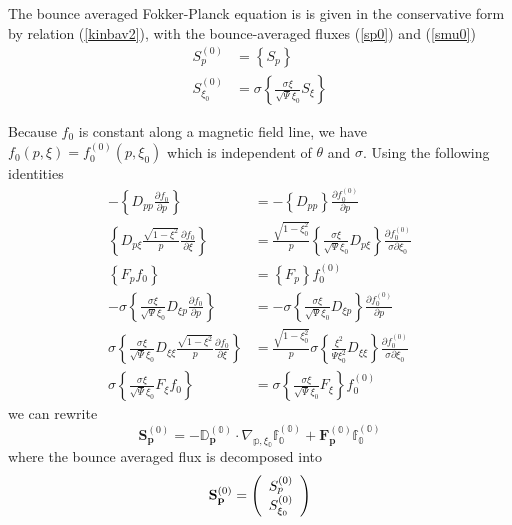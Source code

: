 
The bounce averaged Fokker-Planck equation is is given in the
conservative form by relation (\ref{kinbav2}), with the
bounce-averaged fluxes (\ref{sp0}) and (\ref{smu0})
\begin{align}
S_{p}^{\left(  0\right)  }  & =\left\{  S_{p}\right\}  \\
S_{\xi_{0}}^{\left(  0\right)  }  & =\sigma\left\{  \frac{\sigma\xi}%
{\sqrt{\Psi}\xi_{0}}S_{\xi}\right\}
\end{align}

Because $f_{0}$ is constant along a magnetic field line, we have $f_{0}\left(
p,\xi\right)  =f_{0}^{(0)}\left(  p,\xi_{0}\right)  $ which is independent of
$\theta$ and $\sigma$. Using the following identities
\begin{align}
-\left\{  D_{pp}\frac{\partial f_{0}}{\partial p}\right\}    & =-\left\{
D_{pp}\right\}  \frac{\partial f_{0}^{(0)}}{\partial p}\\
\left\{  D_{p\xi}\frac{\sqrt{1-\xi^{2}}}{p}\frac{\partial f_{0}}{\partial\xi
}\right\}    & =\frac{\sqrt{1-\xi_{0}^{2}}}{p}\left\{  \frac{\sigma\xi}%
{\sqrt{\Psi}\xi_{0}}D_{p\xi}\right\}  \frac{\partial f_{0}^{(0)}}%
{\sigma\partial\xi_{0}}\\
\left\{  F_{p}f_{0}\right\}    & =\left\{  F_{p}\right\}  f_{0}^{(0)}\\
-\sigma\left\{  \frac{\sigma\xi}{\sqrt{\Psi}\xi_{0}}D_{\xi p}\frac{\partial
f_{0}}{\partial p}\right\}    & =-\sigma\left\{  \frac{\sigma\xi}{\sqrt{\Psi
}\xi_{0}}D_{\xi p}\right\}  \frac{\partial f_{0}^{(0)}}{\partial p}\\
\sigma\left\{  \frac{\sigma\xi}{\sqrt{\Psi}\xi_{0}}D_{\xi\xi}\frac{\sqrt
{1-\xi^{2}}}{p}\frac{\partial f_{0}}{\partial\xi}\right\}    & =\frac
{\sqrt{1-\xi_{0}^{2}}}{p}\sigma\left\{  \frac{\xi^{2}}{\Psi\xi_{0}^{2}}%
D_{\xi\xi}\right\}  \frac{\partial f_{0}^{(0)}}{\sigma\partial\xi_{0}}\\
\sigma\left\{  \frac{\sigma\xi}{\sqrt{\Psi}\xi_{0}}F_{\xi}f_{0}\right\}    &
=\sigma\left\{  \frac{\sigma\xi}{\sqrt{\Psi}\xi_{0}}F_{\xi}\right\}
f_{0}^{(0)}%
\end{align}
we can rewrite
\begin{equation}
\mathbf{S}_{\mathbf{p}}^{(0)}=-\mathbb{{D}_{\mathbf{p}}^{(0)}\cdot
\nabla_{p,\xi_{0}}f_{0}^{(0)}+\mathbf{F}_{\mathbf{p}}^{(0)}f_{0}^{(0)}}%
\end{equation}
where the bounce averaged flux is decomposed into
\begin{equation}
\mathbf{S}_{\mathbf{p}}^{(0)}=\left(
\begin{array}
[c]{l}%
S_{p}^{(0)}\\
S_{\xi_{0}}^{(0)}%
\end{array}
\right)
\end{equation}
